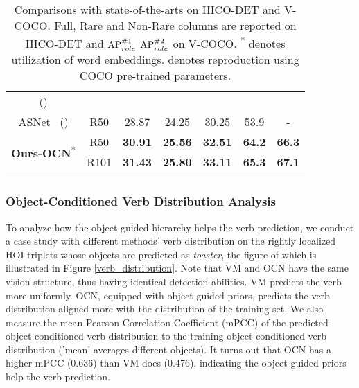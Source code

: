\documentclass[letterpaper]{article} %
\begin{document}
\begin{table}[t]
\begin{tabular}{ccccc|cc}
    {\tiny (\citeauthor{tamura2021qpic})}  &       &       &       &       &       &  \\
    ASNet \ (\citeauthor{chen2021ASNet}) & R50 & 28.87  & 24.25  & 30.25 & 53.9 & - \\
    \hline
    \multirow{2}[2]{*}{\textbf{Ours-OCN}\textsuperscript{*}} & R50 & \textbf{30.91} & \textbf{25.56} & \textbf{32.51} & \textbf{64.2} & \textbf{66.3} \\
          & R101 & \textbf{31.43} & \textbf{25.80} & \textbf{33.11} & \textbf{65.3} & \textbf{67.1} \\
    \Xhline{1.0pt}
    \end{tabular}%
    \caption{Comparisons with state-of-the-arts on HICO-DET and V-COCO. Full, Rare and Non-Rare columns are reported on HICO-DET and ${\rm AP}_{role}^{\#1}$  ${\rm AP}_{role}^{\#2}$ on V-COCO. \textsuperscript{*} denotes utilization of word embeddings. \textsuperscript{\dag} denotes reproduction using COCO pre-trained parameters.}
  \label{SOTA_HICO_VCOCO}%
\end{table}%




\subsubsection{Object-Conditioned Verb Distribution Analysis} To analyze how the object-guided hierarchy helps the verb prediction, we conduct a case study with different methods' verb distribution on the rightly localized HOI triplets whose objects are predicted as \textit{toaster}, the figure of which is illustrated in Figure \ref{verb_distribution}. Note that VM and OCN have the same vision structure, thus having identical detection abilities. VM predicts the verb more uniformly. OCN, equipped with object-guided priors, predicts the verb distribution aligned more with the distribution of the training set. We also measure the mean Pearson Correlation Coefficient (mPCC) \cite{benesty2009pearsoncoef} of the predicted object-conditioned verb distribution to the training object-conditioned verb distribution ('mean' averages different objects). It turns out that OCN has a higher mPCC (0.636) than VM does (0.476), indicating the object-guided priors help the verb prediction.
\end{document}
